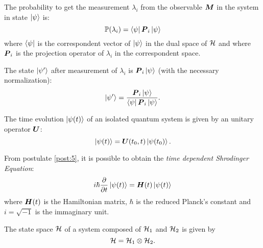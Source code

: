     \begin{postulate}
        The probability to get the measurement $\lambda_i$ from the observable 
        $\bm{\relax{M}}$ in the system in state $\ket{\psi}$ is:
        \begin{equation*}
            \mathbb{P}(\lambda_i)=\bra{\psi}\bm{\relax{P}}_i\ket{\psi}
        \end{equation*}
        where $\bra{\psi}$ is the correspondent vector of $\ket{\psi}$ in the 
        dual space of $\mathcal{H}$ and where $\bm{\relax{P}}_i$ is the projection operator
        of $\lambda_i$ in the correspondent space.
        \label{post:3}
    \end{postulate}

    \begin{postulate}
        The state $\ket{\psi'}$ after measurement of $\lambda_i$ is $\bm{\relax{P}}_i\ket{\psi}$ (with the
        necessary normalization):
        \begin{equation*}
            \ket{\psi'}=\frac{\bm{\relax{P}}_i\ket{\psi}}{\bra{\psi}\bm{\relax{P}}_i\ket{\psi}}.
        \end{equation*}
        \label{post:4}
    \end{postulate}

    \begin{postulate}
        The time evolution $\ket{\psi(t)}$ of an isolated quantum system is given by an unitary operator
        $\bm{\relax{U}}$:
        \begin{equation*}
            \ket{\psi(t)}=\bm{\relax{U}}(t_0,t)\ket{\psi(t_0)}.
        \end{equation*}
        \label{post:5}
    \end{postulate}
    From postulate \ref{post:5}, it is possible to obtain the \emph{time dependent Shrodinger Equation}:
    \begin{equation}
        i\hbar\partialderivative{}{t}\ket{\psi(t)}=\Operator{H}(t)\ket{\psi(t)}
    \end{equation}
    where $\bm{\relax{H}}(t)$ is the Hamiltonian matrix, $\hbar$ is the reduced Planck's constant and $i=\sqrt{-1}$
    is the immaginary unit.

    \begin{postulate}
        The state space $\mathcal{H}$ of a system composed of $\mathcal{H}_1$ and $\mathcal{H}_2$ is given by
        \begin{equation*}
            \mathcal{H}=\mathcal{H}_1\otimes\mathcal{H}_2.
        \end{equation*}
        \label{post:6}
    \end{postulate}

